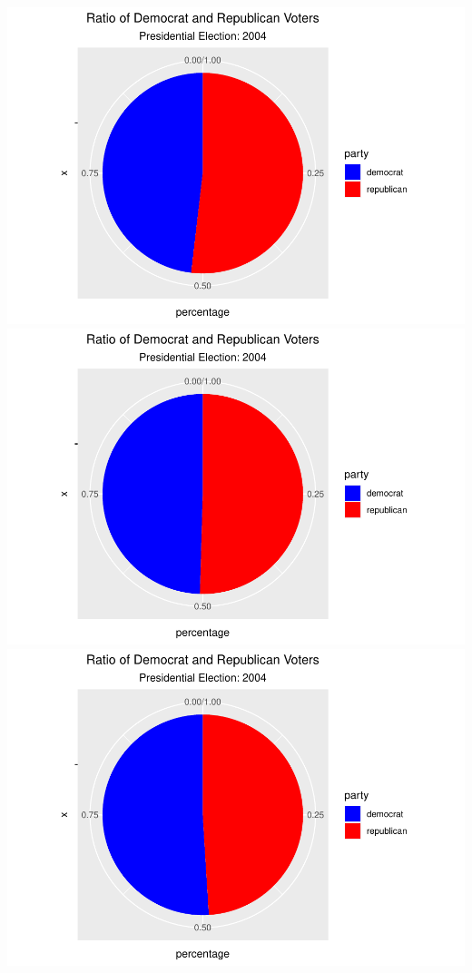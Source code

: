 \documentclass[
]{article}
\begin{document}
\includegraphics{election_files/figure-latex/anim-70.pdf}
\includegraphics{election_files/figure-latex/anim-71.pdf}
\includegraphics{election_files/figure-latex/anim-72.pdf}
\end{document}
